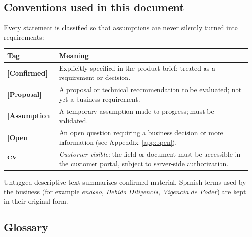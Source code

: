 \documentclass[11pt,a4paper]{article}
\newcommand{\tagconf}{\textcolor{green!45!black}{\textbf{[Confirmed]}}}
\newcommand{\tagprop}{\textcolor{orange!80!black}{\textbf{[Proposal]}}}
\newcommand{\tagassm}{\textcolor{blue!60!black}{\textbf{[Assumption]}}}
\newcommand{\tagopen}{\textcolor{red!70!black}{\textbf{[Open]}}}
\newcommand{\cv}{\textsuperscript{\textcolor{panablue}{\textbf{CV}}}}
\begin{document}
\subsection{Conventions used in this document}

Every statement is classified so that assumptions are never silently turned into
requirements:

\begin{longtable}{@{}L{3.2cm}L{12.6cm}@{}}
	\toprule
	\textbf{Tag} & \textbf{Meaning}
	\\
	\midrule
	\endhead
	\tagconf{}   & Explicitly specified in the product brief; treated as a
	requirement or decision.
	\\
	\tagprop{}   & A proposal or technical recommendation to be evaluated; not yet
	a
	business requirement.
	\\
	\tagassm{}   & A temporary assumption made to progress; must be validated.
	\\
	\tagopen{}   & An open question requiring a business decision or more
	information (see Appendix~\ref{app:open}).
	\\
	\cv{}        & \emph{Customer-visible}: the field or document must be
	accessible in the customer portal, subject to server-side authorization.
	\\
	\bottomrule
\end{longtable}

Untagged descriptive text summarizes confirmed material. Spanish terms used by
the business (for example \emph{endoso}, \emph{Debida Diligencia},
\emph{Vigencia de Poder}) are kept in their original form.

\subsection{Glossary}
\end{document}
